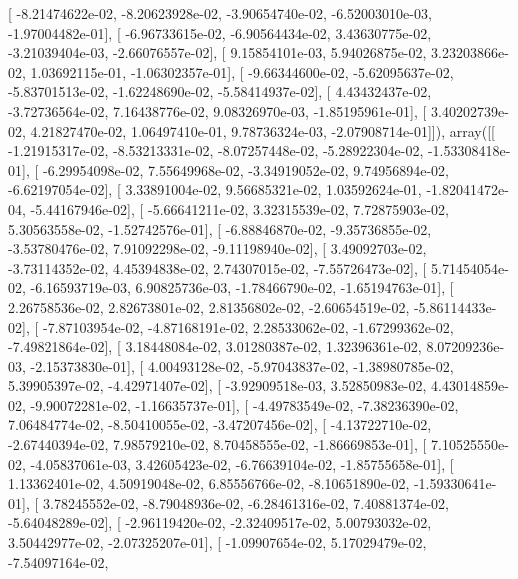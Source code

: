 \documentclass{article}
\begin{document}
       [ -8.21474622e-02,  -8.20623928e-02,  -3.90654740e-02,
         -6.52003010e-03,  -1.97004482e-01],
       [ -6.96733615e-02,  -6.90564434e-02,   3.43630775e-02,
         -3.21039404e-03,  -2.66076557e-02],
       [  9.15854101e-03,   5.94026875e-02,   3.23203866e-02,
          1.03692115e-01,  -1.06302357e-01],
       [ -9.66344600e-02,  -5.62095637e-02,  -5.83701513e-02,
         -1.62248690e-02,  -5.58414937e-02],
       [  4.43432437e-02,  -3.72736564e-02,   7.16438776e-02,
          9.08326970e-03,  -1.85195961e-01],
       [  3.40202739e-02,   4.21827470e-02,   1.06497410e-01,
          9.78736324e-03,  -2.07908714e-01]]), array([[ -1.21915317e-02,  -8.53213331e-02,  -8.07257448e-02,
         -5.28922304e-02,  -1.53308418e-01],
       [ -6.29954098e-02,   7.55649968e-02,  -3.34919052e-02,
          9.74956894e-02,  -6.62197054e-02],
       [  3.33891004e-02,   9.56685321e-02,   1.03592624e-01,
         -1.82041472e-04,  -5.44167946e-02],
       [ -5.66641211e-02,   3.32315539e-02,   7.72875903e-02,
          5.30563558e-02,  -1.52742576e-01],
       [ -6.88846870e-02,  -9.35736855e-02,  -3.53780476e-02,
          7.91092298e-02,  -9.11198940e-02],
       [  3.49092703e-02,  -3.73114352e-02,   4.45394838e-02,
          2.74307015e-02,  -7.55726473e-02],
       [  5.71454054e-02,  -6.16593719e-03,   6.90825736e-03,
         -1.78466790e-02,  -1.65194763e-01],
       [  2.26758536e-02,   2.82673801e-02,   2.81356802e-02,
         -2.60654519e-02,  -5.86114433e-02],
       [ -7.87103954e-02,  -4.87168191e-02,   2.28533062e-02,
         -1.67299362e-02,  -7.49821864e-02],
       [  3.18448084e-02,   3.01280387e-02,   1.32396361e-02,
          8.07209236e-03,  -2.15373830e-01],
       [  4.00493128e-02,  -5.97043837e-02,  -1.38980785e-02,
          5.39905397e-02,  -4.42971407e-02],
       [ -3.92909518e-03,   3.52850983e-02,   4.43014859e-02,
         -9.90072281e-02,  -1.16635737e-01],
       [ -4.49783549e-02,  -7.38236390e-02,   7.06484774e-02,
         -8.50410055e-02,  -3.47207456e-02],
       [ -4.13722710e-02,  -2.67440394e-02,   7.98579210e-02,
          8.70458555e-02,  -1.86669853e-01],
       [  7.10525550e-02,  -4.05837061e-03,   3.42605423e-02,
         -6.76639104e-02,  -1.85755658e-01],
       [  1.13362401e-02,   4.50919048e-02,   6.85556766e-02,
         -8.10651890e-02,  -1.59330641e-01],
       [  3.78245552e-02,  -8.79048936e-02,  -6.28461316e-02,
          7.40881374e-02,  -5.64048289e-02],
       [ -2.96119420e-02,  -2.32409517e-02,   5.00793032e-02,
          3.50442977e-02,  -2.07325207e-01],
       [ -1.09907654e-02,   5.17029479e-02,  -7.54097164e-02,
\end{document}
